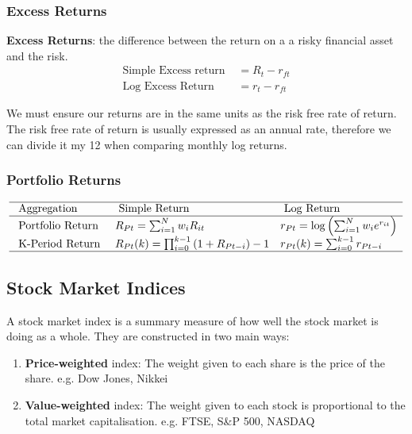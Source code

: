 \documentclass[11pt]{article}
\begin{document}
\subsubsection{Excess Returns}
\begin{shaded}
\textbf{Excess Returns}: the difference between the return on a a risky financial asset and the risk. 
\begin{align*}
    \text{Simple Excess return } &= R_t - r_{ft} \\
    \text{Log Excess Return } &= r_t - r_{ft}
\end{align*}
\begin{note}
    We must ensure our returns are in the same units as the risk free rate of return. The risk free rate of return is usually expressed as an annual rate, therefore we can divide it my 12 when comparing monthly log returns.
\end{note}
\end{shaded}

\subsubsection{Portfolio Returns}

\begin{equation}
\begin{array}{lll}
\hline \text { Aggregation } & \text { Simple Return } & \text { Log Return } \\
\hline \text { Portfolio Return } & R_{P t}=\sum_{i=1}^N w_i R_{i t} & r_{P t}=\log \left(\sum_{i=1}^N w_i e^{r_{i t}}\right) \\
\text { K-Period Return } & R_{P t}(k)=\prod_{i=0}^{k-1}\left(1+R_{P t-i}\right)-1 & r_{P t}(k)=\sum_{i=0}^{k-1} r_{P t-i} \\
\hline
\end{array}
\end{equation}

\subsection{Stock Market Indices}

\begin{shaded}
    A stock market index is a summary measure of how well the stock market is doing as a whole. They are constructed in two main ways:
    \begin{enumerate}
        \item \textbf{Price-weighted} index: The weight given to each share is the price of the share. 
        e.g. Dow Jones, Nikkei 
        \item \textbf{Value-weighted} index: The weight given to each stock is proportional to the total market capitalisation.
        e.g. FTSE, S\&P 500, NASDAQ
    \end{enumerate}
\end{shaded}
\end{document}
